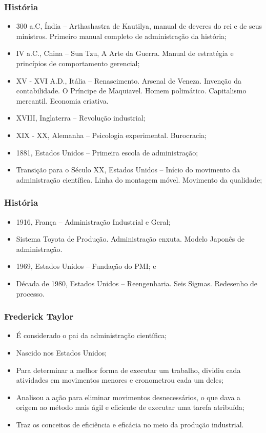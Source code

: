 \documentclass[aspectratio=169]{beamer}
\begin{document}
\begin{frame}
	\frametitle{História}

	\begin{itemize}
		\item 300 a.C, Índia -- Arthashastra de Kautilya, manual de deveres do rei e de seus ministros. Primeiro manual completo de administra\c cão da história;
		\item IV a.C., China -- Sun Tzu, A Arte da Guerra. Manual de estratégia e princípios de comportamento gerencial;
		\item XV - XVI A.D., Itália -- Renascimento. Arsenal de Veneza. Inven\c cão da contabilidade. O Príncipe de Maquiavel. Homem polimático. Capitalismo mercantil. Economia criativa.
		\item XVIII, Inglaterra -- Revolu\c cão industrial;
		\item XIX - XX, Alemanha -- Psicologia experimental. Burocracia;
		\item 1881, Estados Unidos -- Primeira escola de administra\c cão;
		\item Transi\c cão para o Século XX, Estados Unidos -- Início do movimento da administra\c cão científica. Linha do montagem móvel. Movimento da qualidade;
	\end{itemize}
\end{frame}

\begin{frame}
	\frametitle{História}

	\begin{itemize}
		\item 1916, Fran\c ca -- Administra\c cão Industrial e Geral;
		\item Sistema Toyota de Produ\c cão. Administra\c cão enxuta. Modelo Japonês de administra\c cão.
		\item 1969, Estados Unidos -- Funda\c cão do PMI; e
		\item Década de 1980, Estados Unidos -- Reengenharia. Seis Sigmas. Redesenho de processo.
	\end{itemize}
\end{frame}


\begin{frame}
	\frametitle{Frederick Taylor}

	\begin{itemize}
		\item É considerado o pai da administra\c cão científica;
		\item Nascido nos Estados Unidos;
		\item Para determinar a melhor forma de executar um trabalho, dividiu cada atividades em movimentos menores e cronometrou cada um deles;
		\item Analisou a a\c cão para eliminar movimentos desnecessários, o que dava a origem ao método mais ágil e eficiente de executar uma tarefa atribuída;
		\item Traz os conceitos de eficiência e eficácia no meio da produ\c cão industrial.
	\end{itemize}
\end{frame}
\end{document}
